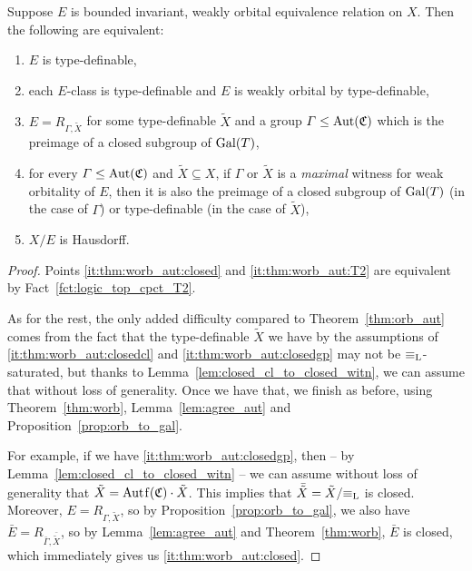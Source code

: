 	\begin{thm}
		\label{thm:worb_aut}
		Suppose $E$ is bounded invariant, weakly orbital equivalence relation on $X$. Then the following are equivalent:
		\begin{enumerate}
			\item
			\label{it:thm:worb_aut:closed}
			$E$ is type-definable,
			\item
			\label{it:thm:worb_aut:closedcl}
			each $E$-class is type-definable and $E$ is weakly orbital by type-definable,
			\item
			\label{it:thm:worb_aut:closedgp}
			$E=R_{\Gamma,\tilde X}$ for some type-definable $\tilde X$ and a group $\Gamma\leq \operatorname{{Aut}}({\mathfrak C})$ which is the preimage of a closed subgroup of $\operatorname{{Gal}}(T)$,
			\item
			for every $\Gamma\leq \operatorname{{Aut}}({\mathfrak C})$ and $\tilde X\subseteq X$, if $\Gamma$ or $\tilde X$ is a \emph{maximal} witness for weak orbitality of $E$, then it is also the preimage of a closed subgroup of $\operatorname{{Gal}}(T)$ (in the case of $\Gamma$) or type-definable (in the case of $\tilde X$),
			\item
			\label{it:thm:worb_aut:T2}
			$X/E$ is Hausdorff.
		\end{enumerate}
	\end{thm}
	\begin{proof}
		Points \ref{it:thm:worb_aut:closed} and \ref{it:thm:worb_aut:T2} are equivalent by Fact~\ref{fct:logic_top_cpct_T2}.
		
		As for the rest, the only added difficulty compared to Theorem~\ref{thm:orb_aut} comes from the fact that the type-definable $\tilde X$ we have by the assumptions of \ref{it:thm:worb_aut:closedcl} and \ref{it:thm:worb_aut:closedgp} may not be $\equiv_{\mathrm{L}}$-saturated, but thanks to Lemma~\ref{lem:closed_cl_to_closed_witn}, we can assume that without loss of generality. Once we have that, we finish as before, using Theorem~\ref{thm:worb}, Lemma~\ref{lem:agree_aut} and Proposition~\ref{prop:orb_to_gal}.
		
		For example, if we have \ref{it:thm:worb_aut:closedgp}, then -- by Lemma~\ref{lem:closed_cl_to_closed_witn} -- we can assume without loss of generality that $\tilde X=\Autf(\fC)\cdot \tilde X$. This implies that $\bar{\tilde X}=\tilde X/{\equiv_{\mathrm{L}}}$ is closed. Moreover, $E=R_{\Gamma,\tilde X}$, so by Proposition~\ref{prop:orb_to_gal}, we also have $\bar E=R_{\bar \Gamma,\bar{\tilde X}}$, so by Lemma~\ref{lem:agree_aut} and Theorem~\ref{thm:worb}, $\bar E$ is closed, which immediately gives us \ref{it:thm:worb_aut:closed}.
	\end{proof}
	
